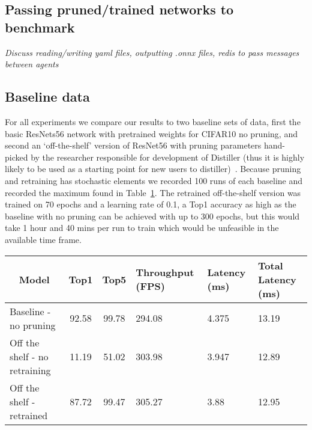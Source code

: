 \documentclass[../Dissertation.tex]{subfiles}
\begin{document}
\doublespacing

\subsection{Passing pruned/trained networks to benchmark}
\emph{\color{red}Discuss reading/writing yaml files, outputting .onnx files, redis to pass messages between agents}

\subsection{Baseline data}\label{sec:baselineData}
For all experiments we compare our results to two baseline sets of data, first the basic ResNets56 network with pretrained weights for CIFAR10 no pruning, and second an `off-the-shelf' version of ResNet56 with pruning parameters hand-picked by the researcher responsible for development of Distiller (thus it is highly likely to be used as a starting point for new users to distiller)~\autocite{liPruningFiltersEfficient2017}.
Because pruning and retraining has stochastic elements we recorded 100 runs of each baseline and recorded the maximum found in Table~\ref{tab:baselineData}.
The retrained off-the-shelf version was trained on 70 epochs and a learning rate of 0.1, a Top1 accuracy as high as the baseline with no pruning can be achieved with up to 300 epochs, but this would take 1 hour and 40 mins per run to train which would be unfeasible in the available time frame. 

\begin{table}[H]
    \begin{tabular}{@{}lccp{25mm}p{23mm}p{28mm}@{}}
    \toprule
    \multicolumn{1}{c}{\textbf{Model}} & \textbf{Top1} & \textbf{Top5} & \textbf{Throughput (FPS)} & \textbf{Latency (ms)} & \textbf{Total Latency (ms)} \\ \midrule
    Baseline - no pruning              & 92.58         & 99.78         & 294.08                    & 4.375                 & 13.19                       \\
    Off the shelf - no retraining      & 11.19         & 51.02         & 303.98                    & 3.947                 & 12.89                       \\
    Off the shelf - retrained          &  87.72        & 99.47         & 305.27                    & 3.88                  & 12.95                           \\ \bottomrule
    \end{tabular}
    \label{tab:baselineData}
\end{table}
\end{document}

